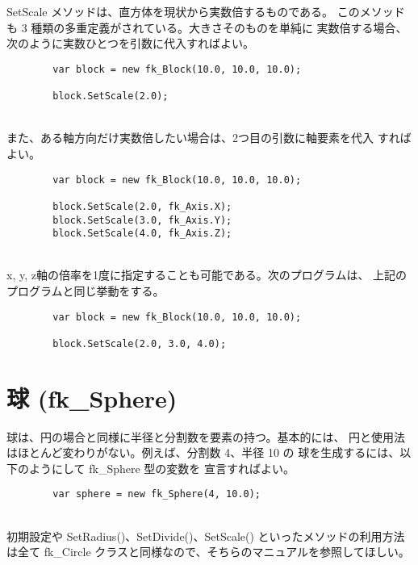 SetScale メソッドは、直方体を現状から実数倍するものである。
このメソッドも 3 種類の多重定義がされている。大きさそのものを単純に
実数倍する場合、次のように実数ひとつを引数に代入すればよい。
\\
\begin{screen}
\begin{verbatim}
        var block = new fk_Block(10.0, 10.0, 10.0);

        block.SetScale(2.0);
\end{verbatim}
\end{screen}
~ \\
また、ある軸方向だけ実数倍したい場合は、2つ目の引数に軸要素を代入
すればよい。
\\
\begin{breakbox}
\begin{verbatim}
        var block = new fk_Block(10.0, 10.0, 10.0);

        block.SetScale(2.0, fk_Axis.X);
        block.SetScale(3.0, fk_Axis.Y);
        block.SetScale(4.0, fk_Axis.Z);
\end{verbatim}
\end{breakbox}
~ \\
x, y, z軸の倍率を1度に指定することも可能である。次のプログラムは、
上記のプログラムと同じ挙動をする。
\\
\begin{screen}
\begin{verbatim}
        var block = new fk_Block(10.0, 10.0, 10.0);

        block.SetScale(2.0, 3.0, 4.0);

\end{verbatim}
\end{screen}

\section{球 (fk\_Sphere)}
球は、円の場合と同様に半径と分割数を要素の持つ。基本的には、
円と使用法はほとんど変わりがない。例えば、分割数 4、半径 10 の
球を生成するには、以下のようにして fk\_Sphere 型の変数を
宣言すればよい。
\\
\begin{breakbox}
\begin{verbatim}
        var sphere = new fk_Sphere(4, 10.0);
\end{verbatim}
\end{breakbox}
~ \\
初期設定や SetRadius()、SetDivide()、SetScale() といったメソッドの利用方法は全て
fk\_Circle クラスと同様なので、そちらのマニュアルを参照してほしい。

